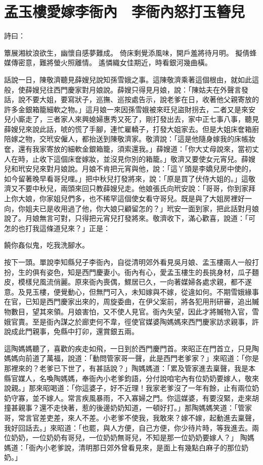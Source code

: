 %

\chapter{孟玉樓愛嫁李衙內　李衙內怒打玉簪兒}

詩曰：

簟展湘紋浪欲生，幽懷自感夢難成。
倚床剩覺添風味，開戶羞將待月明。
擬倩蜂媒傳密意，難將螢火照離情。
遙憐織女佳期近，時看銀河幾曲橫。

話說一日，陳敬濟聽見薛嫂兒說知孫雪娥之事。這陳敬濟乘著這個根由，就如此這般，使薛嫂兒往西門慶家對月娘說。薛嫂只得見月娘，說：「陳姑夫在外聲言發話，說不要大姐，要寫狀子，巡撫、巡按處告示，說老爹在日，收著他父親寄放的許多金銀箱籠細軟之物。」這月娘一來因孫雪娥被來旺兒盜財拐去，二者又是來安兒小廝走了，三者家人來興媳婦惠秀又死了，剛打發出去，家中正七事八事，聽見薛嫂兒來說此話，唬的慌了手腳，連忙雇轎子，打發大姐家去。但是大姐床奩箱廚陪嫁之物，交玳安僱人，都抬送到陳敬濟家。敬濟說：「這是他隨身嫁我的床帳妝奩，還有我家寄放的細軟金銀箱籠，須索還我。」薛嫂道：「你大丈母說來，當初丈人在時，止收下這個床奩嫁妝，並沒見你別的箱籠。」敬濟又要使女元宵兒。薛嫂兒和玳安兒來對月娘說。月娘不肯把元宵與他，說：「這丫頭是李嬌兒房中使的，如今留著晚早看哥兒哩。」把中秋兒打發將來，說：「原是買了伏侍大姐的。」這敬濟又不要中秋兒，兩頭來回只教薛嫂兒走。他娘張氏向玳安說：「哥哥，你到家拜上你大娘，你家姐兒們多，也不稀罕這個使女看守哥兒。既是與了大姐房裡好一向，你姐夫已是收用過了他，你大娘只顧留怎的？」玳安一面到家，把此話對月娘說了。月娘無言可對，只得把元宵兒打發將來。敬濟收下，滿心歡喜，說道：「可怎的也打我這條道兒來？」正是：

饒你姦似鬼，吃我洗腳水。

按下一頭。單說李知縣兒子李衙內，自從清明郊外看見吳月娘、孟玉樓兩人一般打扮，生的俱有姿色，知是西門慶妻小。衙內有心，愛孟玉樓生的長挑身材，瓜子麵皮，模樣兒風流俏麗。原來衙內喪偶，鰥居已久，一向著媒婦各處求親，都不遂意。及見玉樓，便覺動心，但無門可入，未知嫁與不嫁，從違如何。不期雪娥緣事在官，已知是西門慶家出來的，周旋委曲，在伊父案前，將各犯用刑研審，追出贓物數目，望其來領。月娘害怕，又不使人見官。衙內失望，因此才將贓物入官，雪娥官賣。至是衙內謀之於廊吏何不韋，徑使官媒婆陶媽媽來西門慶家訪求親事，許說成此門親事，免縣中打卯，還賞銀五兩。

這陶媽媽聽了，喜歡的疾走如飛，一日到於西門慶門首。來昭正在門首立，只見陶媽媽向前道了萬福，說道：「動問管家哥一聲，此是西門老爹家？」來昭道：「你是那裡來的？老爹已下世了，有甚話說？」陶媽媽道：「累及管家進去稟聲，我是本縣官媒人，名喚陶媽媽，奉衙內小老爹鈞語，分付說咱宅內有位奶奶要嫁人，敬來說親。」那來昭喝道：「你這婆子，好不近理！我家老爹沒了一年有餘，止有兩位奶奶守寡，並不嫁人。常言疾風暴雨，不入寡婦之門。你這媒婆，有要沒緊，走來胡撞甚親事？還不走快著，惹的後邊奶奶知道，一頓好打。」那陶媽媽笑道：「管家哥，常言官差吏差，來人不差。小老爹不使我，我敢來？嫁不嫁，起動進去稟聲，我好回話去。」來昭道：「也罷，與人方便，自己方便，你少待片時，等我進去。兩位奶奶，一位奶奶有哥兒，一位奶奶無哥兒，不知是那一位奶奶要嫁人？」 陶媽媽道：「衙內小老爹說，清明那日郊外曾看見來，是面上有幾點白麻子的那位奶奶。」

